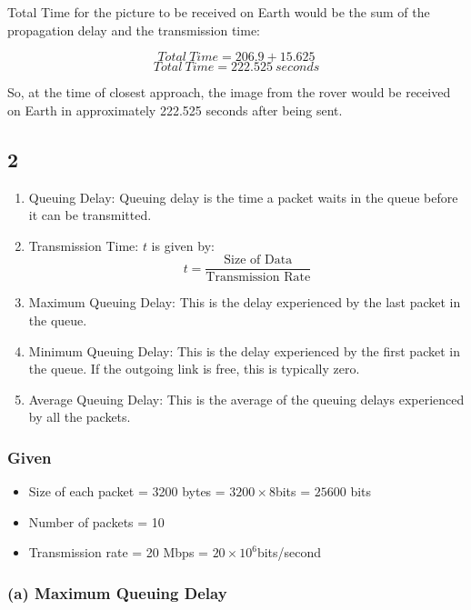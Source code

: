 \documentclass[
]{article}
\providecommand{\tightlist}{%
  \setlength{\itemsep}{0pt}\setlength{\parskip}{0pt}}
\begin{document}
Total Time for the picture to be received on Earth would be the sum of
the propagation delay and the transmission time:

\[
Total~Time = 206.9 + 15.625
\] \[
Total~Time = 222.525~seconds
\]

So, at the time of closest approach, the image from the rover would be
received on Earth in approximately 222.525 seconds after being sent.

\hypertarget{section-1}{%
\subsection{2}\label{section-1}}

\begin{enumerate}
\def\labelenumi{\arabic{enumi}.}
\tightlist
\item
  Queuing Delay: Queuing delay is the time a packet waits in the queue
  before it can be transmitted.
\item
  Transmission Time: \(t\) is given
  by:\[t = \frac{{\text{Size of Data}}}{{\text{Transmission Rate}}}\]
\item
  Maximum Queuing Delay: This is the delay experienced by the last
  packet in the queue.
\item
  Minimum Queuing Delay: This is the delay experienced by the first
  packet in the queue. If the outgoing link is free, this is typically
  zero.
\item
  Average Queuing Delay: This is the average of the queuing delays
  experienced by all the packets.
\end{enumerate}

\hypertarget{given}{%
\subsubsection{Given}\label{given}}

\begin{itemize}
\tightlist
\item
  Size of each packet = 3200 bytes = \(3200 \times 8\)bits = \(25600\)
  bits
\item
  Number of packets = 10
\item
  Transmission rate = 20 Mbps = \(20 \times 10^6\)bits/second
\end{itemize}

\hypertarget{a-maximum-queuing-delay}{%
\subsubsection{(a) Maximum Queuing
Delay}\label{a-maximum-queuing-delay}}
\end{document}
